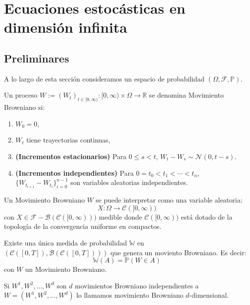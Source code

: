 \section{Ecuaciones estocásticas en dimensión infinita}

\subsection{Preliminares}

A lo largo de esta sección consideramos un espacio de probabilidad $(\Omega, \mathcal{F}, \mathbb{P})$.

\begin{defn}
  Un proceso $W:=\left(W_t\right)_{t \in[0, \infty)}:[0, \infty) \times \Omega \rightarrow \mathbb{R}$ se denomina Movimiento Browniano si:
  \begin{enumerate}
    \item $W_0=0$,
    \item $W_t$ tiene trayectorias continuas,
    \item \textbf{(Incrementos estacionarios)} Para $0 \leq s < t$, $W_t - W_s \sim \mathcal{N}(0, t-s)$.
    \item \textbf{(Incrementos independientes)} Para $0 = t_0 < t_1 < \cdots < t_n $, $\big\{ W_{t_{i+1}} - W_{t_i} \big\}_{i=0}^{n-1}$ son variables aleatorias independientes.
  \end{enumerate}
\end{defn}

\begin{obs}[]
  Un Movimiento Browniano $W$ se puede interpretar como una variable aleatoria:
  \[
    X: \Omega \rightarrow \mathcal{C}([0 ,\infty))
  \]
  con $X \in \mathcal{F}-\mathcal{B}(\mathcal{C}([0, \infty)))$ medible donde $\mathcal{C}([0, \infty))$ está dotado de la topología de la convergencia uniforme en compactos.
\end{obs}

\begin{teo}
  Existe una única medida de probabilidad $\mathbb{W}$ en $(\mathcal{C}([0, T]), \mathcal{B}(\mathcal{C}([0, T])))$ que genera un moviento Browniano. Es decir:
  \[
    \mathbb{W}\left( A \right) = \mathbb{P}\left( W \in A \right)
  \]
  con $W$ un Movimiento Browniano.
\end{teo}

\begin{defn}
  Si $W^1, W^2, \ldots, W^d$ son $d$ movimientos Browniano independientes a $W = (W^1, W^2, \ldots, W^d)$ lo llamamos movimiento Browniano $d$-dimensional.
\end{defn}

